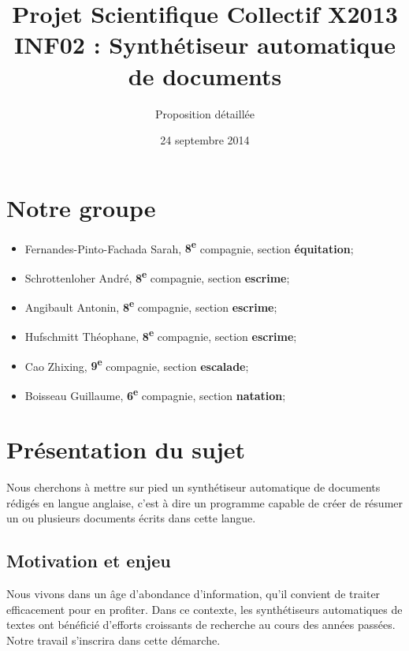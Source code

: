 \documentclass{article}           %
\title{Projet Scientifique Collectif X2013 \\INF02 : Synthétiseur automatique de documents}     %
\author{Proposition détaillée}        %
\date{24 septembre 2014}
\begin{document}

\maketitle                        %


\newpage

\tableofcontents			
\newpage

\section*{Notre groupe}

\begin{itemize}
 \item Fernandes-Pinto-Fachada Sarah, \textbf{8\textsuperscript{e}} compagnie, section \textbf{équitation};
 \item Schrottenloher André, \textbf{8\textsuperscript{e}} compagnie, section \textbf{escrime};
 \item Angibault Antonin, \textbf{8\textsuperscript{e}} compagnie, section \textbf{escrime};
 \item Hufschmitt Théophane, \textbf{8\textsuperscript{e}} compagnie, section \textbf{escrime};
 \item Cao Zhixing, \textbf{9\textsuperscript{e}} compagnie, section \textbf{escalade};
 \item Boisseau Guillaume, \textbf{6\textsuperscript{e}} compagnie, section \textbf{natation};
\end{itemize}


\section{Présentation du sujet} %

Nous cherchons à mettre sur pied un synthétiseur automatique de documents rédigés en langue anglaise, c'est à dire un programme capable de créer de résumer un ou plusieurs documents écrits dans cette langue.

\subsection{Motivation et enjeu}
Nous vivons dans un \^{a}ge d'abondance d'information, qu'il convient de traiter efficacement pour en profiter. Dans ce contexte, les synthétiseurs automatiques de textes ont bénéficié d'efforts croissants de recherche au cours des années passées. Notre travail s'inscrira dans cette démarche.
\end{document}
